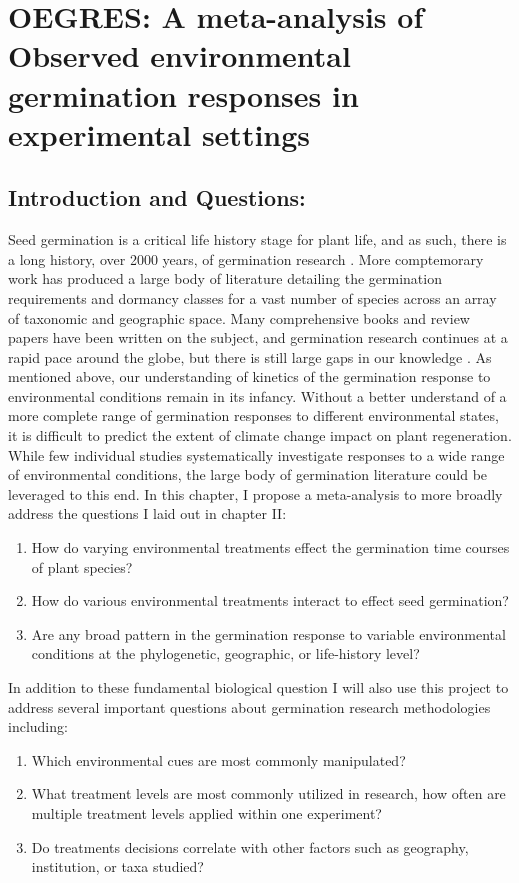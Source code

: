 \documentclass{article}\usepackage[]{graphicx}\usepackage[]{color}
\begin{document}
\section*{OEGRES: A meta-analysis of Observed environmental germination responses in experimental settings}
\subsection*{Introduction and Questions:}
\indent\indent Seed germination is a critical life history stage for plant life, and as such, there is a long history, over 2000 years, of germination research \citep{Baskin2014}. More comptemorary work has produced a large body of literature detailing the germination requirements and dormancy classes for a vast number of species across an array of taxonomic and geographic space. Many comprehensive books and review papers have been written on the subject, and germination research continues at a rapid pace around the globe, but there is still large gaps in our knowledge \citep{Baskin2014}. As mentioned above, our understanding of  kinetics of the germination response to environmental conditions remain in its infancy.  Without a better understand of a more complete range of germination responses to different environmental states, it is difficult to predict the extent of climate change impact on plant regeneration. While few individual studies systematically investigate responses to a wide range of environmental conditions, the large body of germination literature could be leveraged to this end. In this chapter, I propose a meta-analysis to more broadly address the questions I laid out in chapter II:
\begin{enumerate}
\item How do varying environmental treatments effect the germination time courses of plant species?
\item How do various environmental treatments interact to effect seed germination?
\item Are any broad pattern in the germination response to variable environmental conditions at the phylogenetic, geographic, or life-history level?
\end{enumerate}
\indent\indent In addition to these fundamental biological question I will also use this project to address several important questions about germination research methodologies including:
\begin{enumerate}
\item Which environmental cues are most commonly manipulated?
\item What treatment levels are most commonly utilized in research, how often are multiple treatment levels applied within one experiment?
\item Do treatments decisions correlate with other factors such as geography, institution, or taxa studied?
\end{enumerate}
\end{document}
